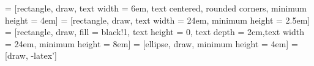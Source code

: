 \usetikzlibrary{shapes,arrows}

 = [rectangle, draw, text width = 6em, text centered, rounded corners, minimum height = 4em]
 = [rectangle, draw, text width = 24em, minimum height = 2.5em]
 = [rectangle, draw, fill = black!1, text height = 0, text depth = 2cm,text width = 24em, minimum height = 8em]
 = [ellipse, draw, minimum height = 4em]
 = [draw, -latex']
